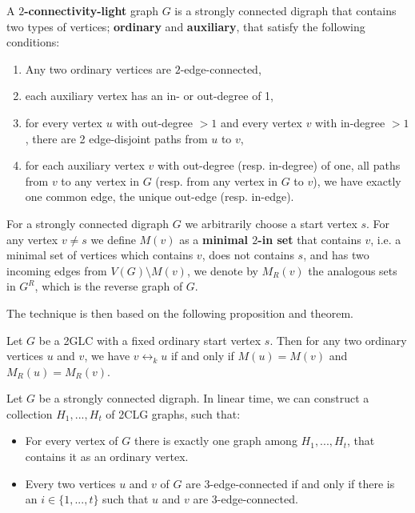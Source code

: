 \begin{definition}
    A \textbf{$2$-connectivity-light} graph $G$ is a strongly connected digraph that contains two types of vertices; \textbf{ordinary} and \textbf{auxiliary},
    that satisfy the following conditions:
    \begin{enumerate}
        \item Any two ordinary vertices are $2$-edge-connected,
        \item each auxiliary vertex has an in- or out-degree of 1,
        \item for every vertex $u$ with out-degree $>1$ and every vertex $v$ with in-degree $>1$, there are 2 edge-disjoint paths from $u$ to $v$,
        \item for each auxiliary vertex $v$ with out-degree (resp. in-degree) of one, all paths from $v$ to any vertex in $G$ (resp. from any vertex in $G$ to $v$),
        we have exactly one common edge, the unique out-edge (resp. in-edge).
    \end{enumerate}
\end{definition}

\begin{definition}
    For a strongly connected digraph $G$ we arbitrarily choose a start vertex $s$. For any vertex $v \neq s$ we define $M(v)$ as a \textbf{minimal $2$-in set} that contains $v$, i.e. a minimal set of vertices which contains $v$, does
    not contains $s$, and has two incoming edges from $V(G) \setminus M(v)$, we denote by $M_R(v)$ the analogous sets in $G^R$, which is the reverse graph of 
    $G$.
\end{definition}

The technique is then based on the following proposition and theorem.

\renewcommand{\theproposition}{I.3} 
\begin{proposition}
    Let $G$ be a 2GLC with a fixed ordinary start vertex $s$. Then for any two ordinary vertices $u$ and $v$, we have $v \leftrightarrow_k u$
    if and only if $M(u) = M(v)$ and $M_R(u) = M_R(v)$.
\end{proposition}
\renewcommand{\theproposition}{\arabic{proposition}}

\renewcommand{\thetheorem}{II.5} 
\begin{theorem}
    Let $G$ be a strongly connected digraph. In linear time, we can construct a collection $H_1, ..., H_t$ of 2CLG graphs, such that:
    \begin{itemize}
        \item For every vertex of $G$ there is exactly one graph among $H_1,..., H_t$, that contains it as an ordinary vertex.
        \item Every two vertices $u$ and $v$ of $G$ are $3$-edge-connected if and only if there is an $i \in \{1, ...,t\}$ such that $u$ and $v$
        are 3-edge-connected.
    \end{itemize}
\end{theorem}
\renewcommand{\thetheorem}{\arabic{theorem}}